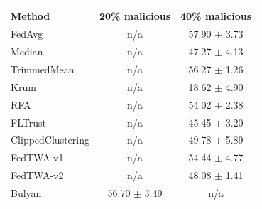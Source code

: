 \begin{tabular}{lcc}
\toprule
Method & 20\% malicious & 40\% malicious \\
\midrule
FedAvg & n/a & 57.90 $\pm$ 3.73 \\
Median & n/a & 47.27 $\pm$ 4.13 \\
TrimmedMean & n/a & 56.27 $\pm$ 1.26 \\
Krum & n/a & 18.62 $\pm$ 4.90 \\
RFA & n/a & 54.02 $\pm$ 2.38 \\
FLTrust & n/a & 45.45 $\pm$ 3.20 \\
ClippedClustering & n/a & 49.78 $\pm$ 5.89 \\
FedTWA-v1 & n/a & 54.44 $\pm$ 4.77 \\
FedTWA-v2 & n/a & 48.08 $\pm$ 1.41 \\
Bulyan & 56.70 $\pm$ 3.49 & n/a \\
\bottomrule
\end{tabular}